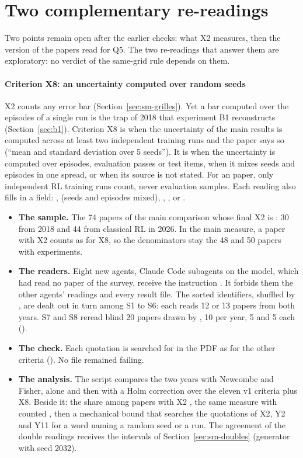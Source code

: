 \section{Two complementary re-readings}\label{sec:sm-relectures}

Two points remain open after the earlier checks: what X2 measures, then the version of the papers read
for Q5. The two re-readings that answer them are exploratory: no verdict of the same-grid rule depends
on them.

\paragraph{Criterion X8: an uncertainty computed over random seeds}\label{sec:sm-x8}
X2 counts any error bar (Section~\ref{sec:sm-grilles}). Yet a bar computed over the episodes of a
single run is the trap of 2018 that experiment B1 reconstructs (Section~\ref{sec:b1}). Criterion X8
is  when the uncertainty of the main results is computed across at
least two independent training runs and the paper says so (\enquote{mean and standard deviation over 5
seeds}). It is  when the uncertainty is computed over episodes, evaluation passes or test
items, when it mixes seeds and episodes in one spread, or when its source is not stated. For an
 paper, only independent RL training runs count, never evaluation samples. Each reading also
fills in a  field: ,  (seeds and episodes mixed),
, ,  or .
\begin{itemize}
  \item \textbf{The sample.} The 74 papers of the main comparison whose final X2 is : 30
  from 2018 and 44 from classical RL in 2026. In the main measure, a paper with X2  counts as
   for X8, so the denominators stay the 48 and 50 papers with experiments.
  \item \textbf{The readers.} Eight new agents, Claude Code subagents on the  model, which
  had read no paper of the survey, receive the instruction . It forbids them
  the other agents' readings and every result file. The sorted identifiers, shuffled by
  , are dealt out in turn among S1 to S6: each reads 12 or 13 papers from
  both years. S7 and S8 reread blind 20 papers drawn by , 10 per year, 5 and
  5 each ().
  \item \textbf{The check.} Each quotation is searched for in the PDF as for the other criteria
  (). No file remained failing.
  \item \textbf{The analysis.} The script  compares the two years with
  Newcombe and Fisher, alone and then with a Holm correction over the eleven v1 criteria plus X8.
  Beside it: the share among papers with X2 , the same measure with  counted
  , then a mechanical bound that searches the quotations of X2, Y2 and Y11 for a word naming a random
  seed or a run. The agreement of the double readings receives the intervals of
  Section~\ref{sec:sm-doubles} (generator with seed 2032).
\end{itemize}
